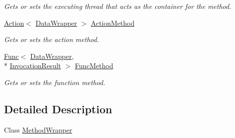 \begin{DoxyCompactItemize}
\begin{DoxyCompactList}\small\item\em Gets or sets the executing thread that acts as the container for the method. \end{DoxyCompactList}\item 
\hyperlink{namespace_stand_alone_framework_1_1_factories_1_1_method_factory_aeb6e05dc016e73b072faae5a5d275f6aa004bf6c9a40003140292e97330236c53}{Action}$<$ \hyperlink{class_stand_alone_framework_1_1_data_wrapper}{Data\+Wrapper} $>$ \hyperlink{class_stand_alone_framework_1_1_factories_1_1_method_factory_1_1_method_wrapper_ab783cacf95f59ff0df1f3b36d981c468}{Action\+Method}
\begin{DoxyCompactList}\small\item\em Gets or sets the action method. \end{DoxyCompactList}\item 
\hyperlink{namespace_stand_alone_framework_1_1_factories_1_1_method_factory_aeb6e05dc016e73b072faae5a5d275f6aa00d0b4f2d7dcdaaef835b97cf5d1e0df}{Func}$<$ \hyperlink{class_stand_alone_framework_1_1_data_wrapper}{Data\+Wrapper}, \\*
\hyperlink{class_stand_alone_framework_1_1_framework_classes_1_1_invocation_result}{Invocation\+Result} $>$ \hyperlink{class_stand_alone_framework_1_1_factories_1_1_method_factory_1_1_method_wrapper_a3a7ae8b79a922646649ffea70f5e60e9}{Func\+Method}
\begin{DoxyCompactList}\small\item\em Gets or sets the function method. \end{DoxyCompactList}\end{DoxyCompactItemize}


\subsection{Detailed Description}
Class \hyperlink{class_stand_alone_framework_1_1_factories_1_1_method_factory_1_1_method_wrapper}{Method\+Wrapper} 



